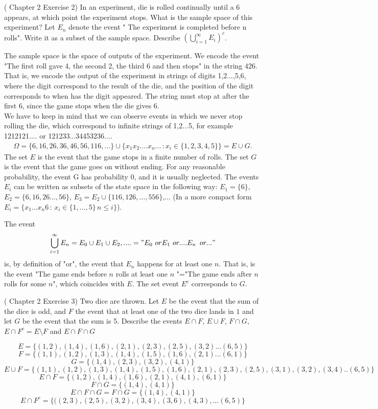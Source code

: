 \documentclass[12pt]{article}
\newcommand{\<}{{\langle \!\! \langle}}
\renewcommand{\>}{{\rangle \!\! \rangle}}
\newcommand{\bel}[2]{\begin{equation} \label{#1} \begin{split} #2
 					\end{split} \end{equation}}
\begin{document}
\begin{ExerciseList}
	\Exercise (\cite{Ross} Chapter 2 Exercise 2) In an experiment, die is rolled continually until a 6 appears, at which point the experiment stops. What is the sample space of this experiment? Let $E_n$ denote the event " The experiment is completed before n rolls". Write it as a subset of the sample space. Describe $\left(\bigcup_{i=1}^\infty E_i\right)^c$.

\Answer The sample space is the space of outputs of the experiment. We encode the event "The first roll gave 4, the second 2, the third 6 and then stops" in the string 426. That is, we encode the output of the experiment in strings of digits 1,2...,5,6,  where the digit correspond to the result of the die, and the position of the digit corresponds to when has the digit appeared. The string must stop at after the first 6, since the game stops when the die gives 6. \\We have to keep in mind that we can observe events in which we never stop rolling the die, which correspond to infinite strings of 1,2...5, for example 1212121.... or  121233...34453236.... 
\bel{}{\Omega=\{ 6, 16, 26, 36, 46, 56,116,...\}\cup\{x_1x_2....x_n...\,: x_{i}\in\{1,2,3,4,5\} \}=E\cup G.}
The set $E$ is the event that the game stops in a finite number of rolls. The set $G$ is the event that the game goes on without ending. For any reasonable probability, the event G has probability 0, and it is usually neglected. 
The events $E_i$ can be written as subsets of the state space in the following way: $E_1=\{6\}$, $E_2=\{6,16,26...,56\}$, $E_3=E_2 \cup \{116,126,...,556\}$,... (In a more compact form $E_i=\{x_1...x_n6\,:\, x_i\in\{1,...,5\}\, n\leq i\}$).

The event $$\bigcup_{i=1}^\infty E_n= E_0\cup E_1\cup E_2,....= "E_0\,\, or E_1 \,\,or ....E_n \,\,\,or ..."$$
is, by definition of "or", the event that $E_n$ happens for at least one $n$. That is, is the event "The game ends before $n$ rolls at least one $n$ "="The game ends after $n$ rolls for some $n$", which coincides with $E$.
The set event $E^c$ corresponds to $G$. 

\Exercise (\cite{Ross} Chapter 2 Exercise 3)
Two dice are thrown. Let $E$ be the event that the sum of the dice is odd, and $F$ the event that at least one of the two dice lands in $1$ and let $G$ be the event that the sum is 5. Describe the events $E\cap F $, $E\cup F$, $F\cap G$, $E\cap F^c=E\setminus F$ and $E \cap F\cap G$

\Answer
 $$E=\{(1,2),(1,4),(1,6),(2,1),(2,3),(2,5),(3,2)...(6,5)\}$$
 $$F=\{(1,1),(1,2),(1,3),(1,4),(1,5),(1,6),(2,1)...(6,1)\} $$
 $$
 G=\{(1,4),(2,3),(3,2),(4,1)\}
 $$
 $$
 E\cup F=\{(1,1),(1,2),(1,3),(1,4),(1,5),(1,6),
 (2,1),(2,3),(2,5),(3,1),(3,2),(3,4)..(6,5)\}
 $$
 $$E\cap F=\{(1,2),(1,4),(1,6),(2,1),(4,1),(6,1)\}$$
 $$
 F\cap G=\{(1,4),(4,1)\}
 $$
 $$
 E\cap F\cap G=F\cap G=\{(1,4),(4,1)\}
 $$
 $$
E\cap F^c=\{((2,3),(2,5),(3,2),(3,4),(3,6),(4,3),...(6,5)\}$$


\end{ExerciseList}
\end{document}
